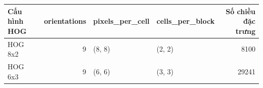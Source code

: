 \begin{tabular}{lrllr}
\toprule
Cấu hình HOG & orientations & pixels_per_cell & cells_per_block & Số chiều đặc trưng \\
\midrule
HOG 8x2 & 9 & (8, 8) & (2, 2) & 8100 \\
HOG 6x3 & 9 & (6, 6) & (3, 3) & 29241 \\
\bottomrule
\end{tabular}
